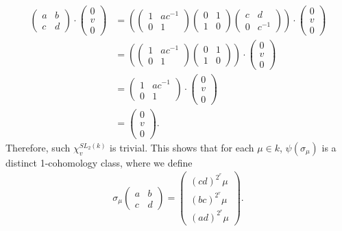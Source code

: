\begin{align*}
	\left(\begin{matrix}a & b\\c & d\end{matrix}\right) \cdot \left(\begin{matrix}0\\v\\0\end{matrix}\right)
	&= 
	\left(
	\left(\begin{matrix}1 & ac^{-1}\\0 & 1\end{matrix}\right)
	\left(\begin{matrix}0 & 1\\1 & 0\end{matrix}\right)
	\left(\begin{matrix}c & d\\0 & c^{-1}\end{matrix}\right)\right)
		\cdot \left(\begin{matrix}0\\v\\0\end{matrix}\right) \\
	&= 
	\left(
	\left(\begin{matrix}1 & ac^{-1}\\0 & 1\end{matrix}\right)
	\left(\begin{matrix}0 & 1\\1 & 0\end{matrix}\right)\right)
		\cdot \left(\begin{matrix}0\\v\\0\end{matrix}\right) \\
	&= 
	\left(\begin{matrix}1 & ac^{-1}\\0 & 1\end{matrix}\right)
		\cdot \left(\begin{matrix}0\\v\\0\end{matrix}\right) \\
	&= 
		\left(\begin{matrix}0\\v\\0\end{matrix}\right).
\end{align*}
Therefore, such $\chi^{SL_2(k)}_v$ is trivial.
This shows that for each $\mu\in k$, $\psi(\sigma_\mu)$ is a distinct 1-cohomology class, where we define
\begin{align*}
	\sigma_\mu\left(\begin{matrix}a & b\\c & d\end{matrix}\right) = \left(\begin{matrix}(cd)^{2^r}\mu\\(bc)^{2^r}\mu\\(ad)^{2^r}\mu\end{matrix}\right).
\end{align*}

